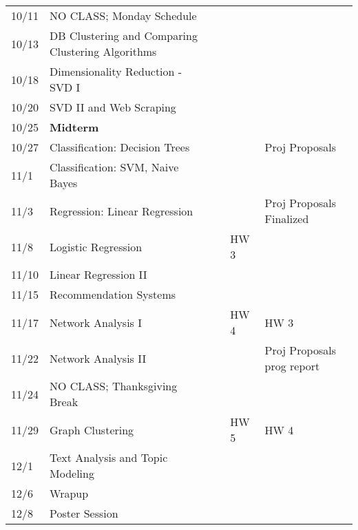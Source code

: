\documentclass[11pt]{article}
\begin{document}
\begin{centering}
\begin{tabular}{||l|p{3in}|l|l|l||}
10/11 &  NO CLASS; Monday Schedule &  & &  \\   
10/13 & DB Clustering and Comparing Clustering Algorithms & & & \\
\hline

10/18 & Dimensionality Reduction - SVD I &&&\\
%
10/20 & SVD II and Web Scraping & & & \\ 
\hline

10/25 & \textbf{Midterm} & &  & \\ 
10/27 & Classification: Decision Trees & & & Proj Proposals\\ 
\hline

11/1 & Classification: SVM, Naive Bayes &  &  &\\ 
11/3 & Regression: Linear Regression & & & Proj Proposals Finalized \\ 
\hline

11/8 & Logistic Regression & & HW 3  &\\ 
11/10 & Linear Regression II & & & \\ 
\hline

11/15 & Recommendation Systems & & &\\ 

11/17 & Network Analysis I & & HW 4 & HW 3\\
\hline

11/22 & Network Analysis II &  & &Proj Proposals prog report \\ 
11/24 & NO CLASS; Thanksgiving Break  & & & \\ 
 \hline

11/29 & Graph Clustering &  & HW 5 & HW 4 \\ 
12/1 & Text Analysis and Topic Modeling && &\\
\hline 

12/6 & Wrapup & & & \\ 
12/8 & Poster Session &  &  &\\ 
\hline\hline


\end{tabular}\\
\end{centering}
\end{document}

